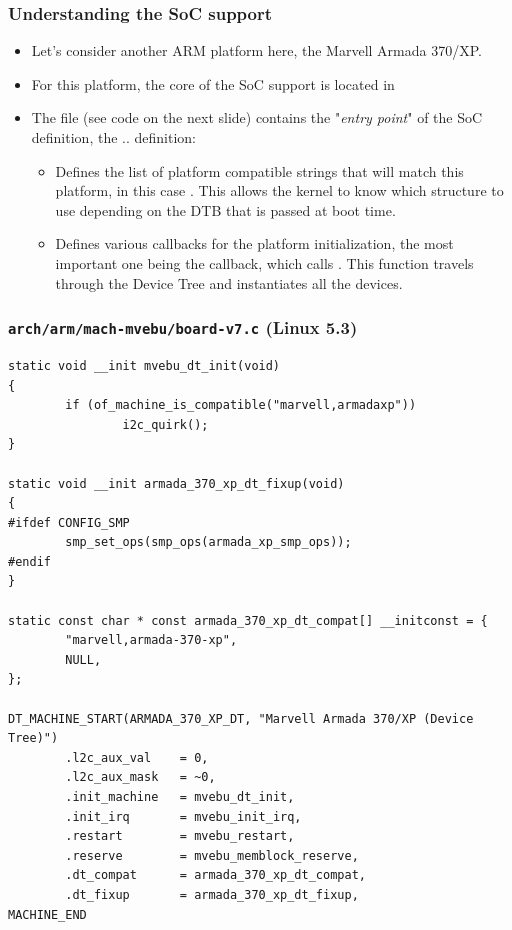 \begin{frame}
  \frametitle{Understanding the SoC support}
  \begin{itemize}
  \item Let's consider another ARM platform here, the Marvell Armada
    370/XP.
  \item For this platform, the core of the SoC support is located in
  \item The  file (see code on the next slide)
    contains the "{\em entry point}" of the SoC definition, the
     ..  definition:
    \begin{itemize}
    \item Defines the list of platform compatible strings that will
      match this platform, in this case
      . This allows the kernel to know
      which  structure to use depending on the DTB
      that is passed at boot time.
    \item Defines various callbacks for the platform initialization,
      the most important one being the  callback,
      which calls . This function travels
      through the Device Tree and instantiates all the devices.
    \end{itemize}
  \end{itemize}
\end{frame}

\begin{frame}[fragile]
  \frametitle{{\tt arch/arm/mach-mvebu/board-v7.c} (Linux 5.3)}
  \begin{block}{}
    \begin{verbatim}
static void __init mvebu_dt_init(void)
{
        if (of_machine_is_compatible("marvell,armadaxp"))
                i2c_quirk();
}

static void __init armada_370_xp_dt_fixup(void)
{
#ifdef CONFIG_SMP
        smp_set_ops(smp_ops(armada_xp_smp_ops));
#endif
}

static const char * const armada_370_xp_dt_compat[] __initconst = {
        "marvell,armada-370-xp",
        NULL,
};

DT_MACHINE_START(ARMADA_370_XP_DT, "Marvell Armada 370/XP (Device Tree)")
        .l2c_aux_val    = 0,
        .l2c_aux_mask   = ~0,
        .init_machine   = mvebu_dt_init,
        .init_irq       = mvebu_init_irq,
        .restart        = mvebu_restart,
        .reserve        = mvebu_memblock_reserve,
        .dt_compat      = armada_370_xp_dt_compat,
        .dt_fixup       = armada_370_xp_dt_fixup,
MACHINE_END
  \end{verbatim}
 \end{block}
\end{frame}

